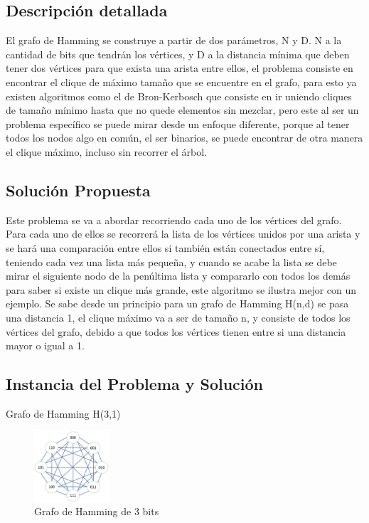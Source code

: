 \documentclass[conference,compsoc]{IEEEtran}
\begin{document}
{\subsection{Descripción detallada}
El grafo de Hamming se construye a partir de dos parámetros, N y D. N a la cantidad de bits que tendrán los vértices, y D a la distancia mínima que deben tener dos vértices para que exista una arista entre ellos, el problema consiste en encontrar el clique de máximo tamaño que se encuentre en el grafo, para esto ya existen algoritmos como el de Bron-Kerbosch que consiste en ir uniendo cliques de tamaño mínimo hasta que no quede elementos sin mezclar, pero este al ser un problema específico se puede mirar desde un enfoque diferente, porque al tener todos los nodos algo en común, el ser binarios, se puede encontrar de otra manera el clique máximo, incluso sin recorrer el árbol.

\subsection{Solución Propuesta}

Este problema se va a abordar recorriendo cada uno de los vértices del grafo. Para cada uno de ellos se recorrerá la lista de los vértices unidos por una arista y se hará una comparación entre ellos si también están conectados entre sí, teniendo cada vez una lista más pequeña, y cuando se acabe la lista se debe mirar el siguiente nodo de la penúltima lista y compararlo con todos los demás para saber si existe un clique más grande, este algoritmo se ilustra mejor con un ejemplo.
Se sabe desde un principio para un grafo de Hamming H(n,d) se pasa una distancia 1, el clique máximo va a ser de tamaño n, y consiste de todos los vértices del grafo, debido a que todos los vértices tienen entre si una distancia mayor o igual a 1.

\subsection{Instancia del Problema y Solución}

Grafo de Hamming H(3,1)

\begin{figure}[h] 
    \centering
    \includegraphics[width=0.25\textwidth]{Problema3/t1.png}
    \caption{Grafo de Hamming de 3 bits}
    \label{fig:mesh1}
\end{figure}

}
\end{document}
